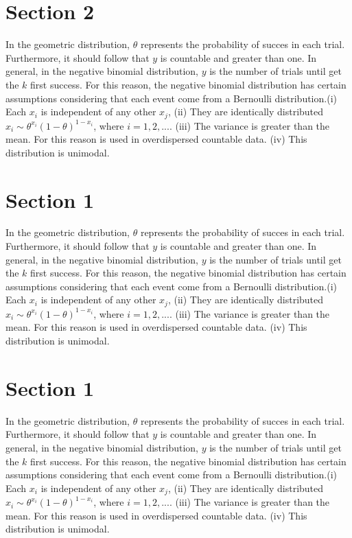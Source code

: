 \documentclass[11pt, a4paper, top=4cm,bottom=3.5cm, right=3cm,left=3cm]{SimpleNotes}
\begin{document}
\section{Section 2}
In the geometric distribution, $\theta$ represents the probability of succes in each trial. Furthermore, it should follow that $y$ is countable and greater than one. In general, in the negative binomial distribution, $y$ is the number of trials until get the $k$ first success. For this reason, the negative binomial distribution has certain assumptions considering that each event come from a Bernoulli distribution.(i) Each $x_i$ is independent of any other $x_j$, (ii) They are identically distributed $x_i\sim\theta^{x_i}(1-\theta)^{1-x_i}$, where $i =1,2,...$. (iii) The variance is greater than the mean. For this reason is used in overdispersed countable data. (iv) This distribution is unimodal.
\section{Section 1}
In the geometric distribution, $\theta$ represents the probability of succes in each trial. Furthermore, it should follow that $y$ is countable and greater than one. In general, in the negative binomial distribution, $y$ is the number of trials until get the $k$ first success. For this reason, the negative binomial distribution has certain assumptions considering that each event come from a Bernoulli distribution.(i) Each $x_i$ is independent of any other $x_j$, (ii) They are identically distributed $x_i\sim\theta^{x_i}(1-\theta)^{1-x_i}$, where $i =1,2,...$. (iii) The variance is greater than the mean. For this reason is used in overdispersed countable data. (iv) This distribution is unimodal.
\section{Section 1}
In the geometric distribution, $\theta$ represents the probability of succes in each trial. Furthermore, it should follow that $y$ is countable and greater than one. In general, in the negative binomial distribution, $y$ is the number of trials until get the $k$ first success. For this reason, the negative binomial distribution has certain assumptions considering that each event come from a Bernoulli distribution.(i) Each $x_i$ is independent of any other $x_j$, (ii) They are identically distributed $x_i\sim\theta^{x_i}(1-\theta)^{1-x_i}$, where $i =1,2,...$. (iii) The variance is greater than the mean. For this reason is used in overdispersed countable data. (iv) This distribution is unimodal.
\end{document}
